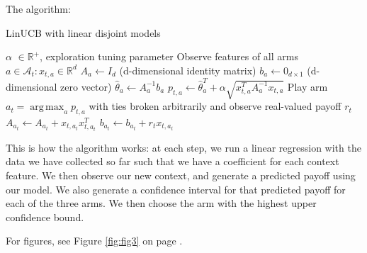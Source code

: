 \documentclass[nojss]{jss}\usepackage[]{graphicx}\usepackage[]{color}
\DeclareMathOperator*{\argmax}{arg\,max}
\begin{document}
The algorithm:

\begin{algorithm}
\caption{LinUCB with linear disjoint models}
\label{Alg:LinUCBDisjoint}
\begin{algorithmic}
\REQUIRE $\alpha$ \(  \in \mathbb{R}^{+} \), exploration tuning parameter
          \STATE Observe features of all arms \(  a \in \mathcal{A}_{t}: x_{t,a} \in \mathbb{R}^{d}\)
		      \STATE \(A_{a} \leftarrow I_{d}  \)  (d-dimensional identity matrix)
		      \STATE \(b_{a} \leftarrow 0_{d\times1}   \) (d-dimensional zero vector)
		\ENDIF
		\STATE \( \hat{\theta}_{a} \leftarrow A_{a}^{-1}b_{a} \)
		\STATE \( p_{t,a} \leftarrow \hat{\theta}_{a}^{T} + \alpha  \sqrt{ x_{t,a}^{T} A_{a}^{-1}x_{t,a}} \)
	\ENDFOR
	\STATE Play arm \(a_t = \argmax_a  p_{t,a}  \) with ties broken arbitrarily and observe real-valued payoff $r_t$
           \STATE \( A_{a_{t}} \leftarrow A_{a_{t}}+ x_{t,a_{t}}x_{t,a_{t}}^{T} \)
           \STATE  \( b_{a_{t}} \leftarrow b_{a_{t}}+ r_{t}x_{t,a_{t}}  \)
\ENDFOR
\end{algorithmic}
\end{algorithm}

This is how the algorithm works: at each step, we run a linear regression with the data we have collected so far such that we have a coefficient for each context feature. We then observe our new context, and generate a predicted payoff using our model. We also generate a confidence interval for that predicted payoff for each of the three arms. We then choose the arm with the highest upper confidence bound.

For figures, see Figure \ref{fig:fig3} on page \pageref{fig:fig3}.
\end{document}
